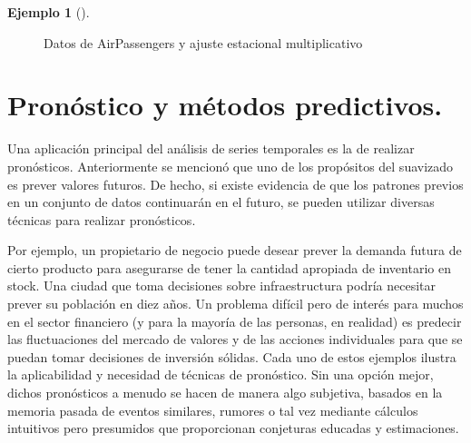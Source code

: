 \documentclass[
  us-letterpaper,
]{scrreprt}
\theoremstyle{plain}
\theoremstyle{definition}
\newtheorem{example}{Ejemplo}[chapter]
\theoremstyle{plain}
\theoremstyle{definition}
\theoremstyle{remark}
\begin{document}
\begin{example}[]
\begin{tcolorbox}
\begin{figure}[H]
\begin{minipage}{0.33\linewidth}


\end{minipage}%

\caption{\label{fig-AEmul}Datos de AirPassengers y ajuste estacional
multiplicativo}

\end{figure}%

\end{tcolorbox}

\end{example}

\section{Pronóstico y métodos
predictivos.}\label{pronuxf3stico-y-muxe9todos-predictivos.}

Una aplicación principal del análisis de series temporales es la de
realizar pronósticos. Anteriormente se mencionó que uno de los
propósitos del suavizado es prever valores futuros. De hecho, si existe
evidencia de que los patrones previos en un conjunto de datos
continuarán en el futuro, se pueden utilizar diversas técnicas para
realizar pronósticos.

Por ejemplo, un propietario de negocio puede desear prever la demanda
futura de cierto producto para asegurarse de tener la cantidad apropiada
de inventario en stock. Una ciudad que toma decisiones sobre
infraestructura podría necesitar prever su población en diez años. Un
problema difícil pero de interés para muchos en el sector financiero (y
para la mayoría de las personas, en realidad) es predecir las
fluctuaciones del mercado de valores y de las acciones individuales para
que se puedan tomar decisiones de inversión sólidas. Cada uno de estos
ejemplos ilustra la aplicabilidad y necesidad de técnicas de pronóstico.
Sin una opción mejor, dichos pronósticos a menudo se hacen de manera
algo subjetiva, basados en la memoria pasada de eventos similares,
rumores o tal vez mediante cálculos intuitivos pero presumidos que
proporcionan conjeturas educadas y estimaciones.
\end{document}
